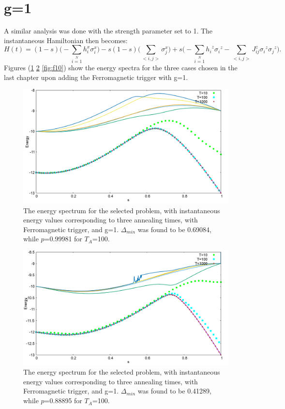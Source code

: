 \documentclass[12]{article}
\begin{document}
\section*{g=1}
A similar analysis was done with the strength parameter set to 1. The instantaneous Hamiltonian then becomes:
\begin{equation}
H(t)=(1-s)\Big(-\sum \limits_{i=1}\limits^N h_i^x \sigma_i^x \Big)- s(1-s)\Big( \sum \limits_{<i,j>}\sigma_{j}^x\Big) +s \Big(-\sum\limits_{i=1}\limits^{N}{h_i}^z{\sigma_i}^z - \sum\limits_{<i,j>}{J_{ij}^z} {\sigma_i}^z{\sigma_j}^z \Big).
\end{equation}
Figures (\ref{fig:f8} \ref{fig:f9} \ref{fig:f10}) show the energy spectra for the three cases chosen in the last chapter upon adding the Ferromagnetic trigger with g=1. 
\begin{figure}[H]
\centering 
\includegraphics[scale=0.3]{733_s12_F_g1.png}
\caption{The energy spectrum for the selected problem, with instantaneous energy values corresponding to three annealing times, with Ferromagnetic trigger, and g=1. $\Delta_{min}$ was found to be 0.69084, while $p$=0.99981 for $T_A$=100. }
\label{fig:f8}
\end{figure}
\begin{figure}[H]
\centering 
\includegraphics[scale=0.3]{950_s12_F_g1.png}
\caption{The energy spectrum for the selected problem, with instantaneous energy values corresponding to three annealing times, with Ferromagnetic trigger, and g=1. $\Delta_{min}$ was found to be 0.41289, while $p$=0.88895 for $T_A$=100.}
\label{fig:f9}
\end{figure}
\end{document}
